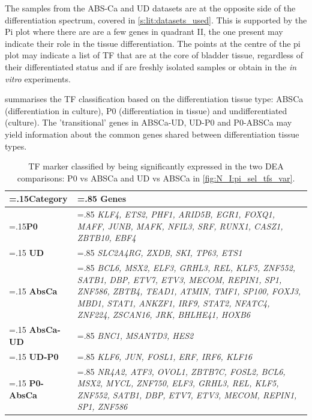 The samples from the ABS-Ca and UD datasets are at the opposite side of the differentiation spectrum, covered in \cref{s:lit:datasets_used}. This is supported by the Pi plot where there are are a few genes in quadrant II, the one present may indicate their role in the tissue differentiation. The points at the centre of the pi plot may indicate a list of TF that are at the core of bladder tissue, regardless of their differentiated status and if are freshly isolated samples or obtain in the \textit{in vitro} experiments.


 summarises the TF classification based on the differentiation tissue type: ABSCa (differentiation in culture), P0 (differentiation in tissue) and undifferentiated (culture). The 'transitional' genes in ABSCa-UD, UD-P0 and P0-ABSCa may yield information about the common genes shared between differentiation tissue types.

\begin{table}[!htb]
  \centering
  \small
  \begin{tabularx}{\textwidth}{>{\hsize=.15\hsize}X|>{\hsize=.85\hsize}X}
    \toprule
    \textbf{Category} & \textbf{Genes} \\
    \midrule
    \textbf{P0} & \textit{KLF4, ETS2, PHF1, ARID5B, EGR1, FOXQ1, MAFF, JUNB, MAFK, NFIL3, SRF, RUNX1, CASZ1, ZBTB10, EBF4} \\
    \midrule
    \textbf{UD} & \textit{SLC2A4RG, ZXDB, SKI, TP63, ETS1} \\
    \midrule
    \textbf{AbsCa} & \textit{BCL6, MSX2, ELF3, GRHL3, REL, KLF5, ZNF552, SATB1, DBP, ETV7, ETV3, MECOM, REPIN1, SP1, ZNF586, ZBTB4, TEAD1, ATMIN, TMF1, SP100, FOXJ3, MBD1, STAT1, ANKZF1, IRF9, STAT2, NFATC4, ZNF224, ZSCAN16, JRK, BHLHE41, HOXB6} \\
    \midrule
    \textbf{AbsCa-UD} & \textit{BNC1, MSANTD3, HES2} \\
    \midrule
    \textbf{UD-P0} & \textit{KLF6, JUN, FOSL1, ERF, IRF6, KLF16} \\
    \midrule
    \textbf{P0-AbsCa} & \textit{NR4A2, ATF3, OVOL1, ZBTB7C, FOSL2, BCL6, MSX2, MYCL, ZNF750, ELF3, GRHL3, REL, KLF5, ZNF552, SATB1, DBP, ETV7, ETV3, MECOM, REPIN1, SP1, ZNF586} \\
    \bottomrule
  \end{tabularx}
  \caption[Tissue differentiation markers]{TF marker classified by being significantly expressed in the two DEA comparisons: P0 vs ABSCa and UD vs ABSCa in \cref{fig:N_I:pi_sel_tfs_var}.} 
  \label{tab:N_I:markers_diff}
\end{table}

